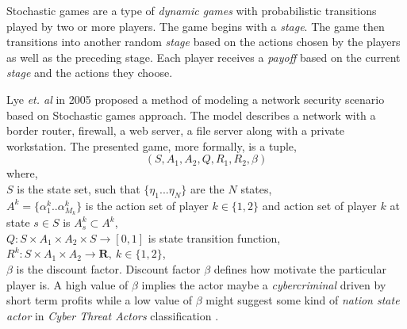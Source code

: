 \documentclass[conference]{IEEEtran}
\begin{document}
Stochastic games \cite{wiki-stochastic} are a type of \textit{dynamic games} with probabilistic transitions played by two or more players.
The game begins with a \textit{stage}.
The game then transitions into another random \textit{stage} based on the actions chosen by the players as well as the preceding stage.
Each player receives a \textit{payoff} based on the current \textit{stage} and the actions they choose.

Lye \textit{et. al} \cite{stochastic} in 2005 proposed a method of modeling a network security scenario based on Stochastic games approach.
The model describes a network with a border router, firewall, a web server, a file server along with a private workstation.
The presented game, more formally, is a tuple,
\begin{equation} \label{sto_tup}
    (S, A_{1}, A_{2}, Q, R_{1}, R_{2}, \beta)
\end{equation}
where,\\
$S$ is the state set, such that $ \{\eta_{1}...\eta_{N}\}$ are the $N$ states,\\
$A^{k} = \{\alpha^{k}_{1}..\alpha^{k}_{M_{k}}\}$ is the action set of player $ k \in \{1, 2\}$ and action set of player $k$ at state $s\in S$ is $A^{k}_{s} \subset A^{k}$,\\
$Q: S\times A_{1} \times A_{2} \times S \rightarrow [0,1]$ is state transition function,\\
$R^{k}: S\times A_{1} \times A_{2} \rightarrow \mathbf{R},\ k \in \{1,2\}$,\\
$\beta$ is the discount factor.
Discount factor $\beta$ defines how motivate the particular player is.
A high value of $\beta$ implies the actor maybe a \textit{cybercriminal} driven by short term profits while a low value of $\beta$ might suggest some kind of \textit{nation state actor} in \textit{Cyber Threat Actors} classification \cite{cyberactor}.
\end{document}
